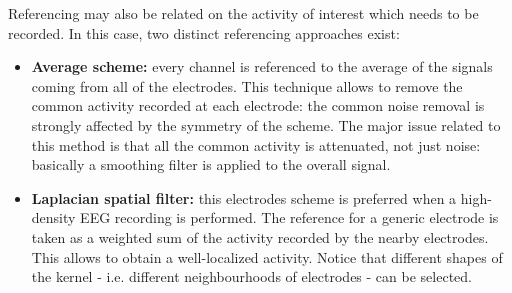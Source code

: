 Referencing may also be related on the activity of interest which needs to be
recorded. In this case, two distinct referencing approaches exist:
\begin{itemize}
    \item \textbf{Average scheme:} every channel is referenced to the average of the signals coming from
          all of the electrodes. This technique allows to remove the common activity recorded at
          each electrode: the common noise removal is strongly affected by the symmetry of the scheme.
          The major issue related to this method is that all the common activity is attenuated, not
          just noise: basically a smoothing filter is applied to the overall signal.
    \item \textbf{Laplacian spatial filter:} this electrodes scheme is preferred when a high-density
          EEG recording is performed. The reference for a generic electrode is taken as a weighted
          sum of the activity recorded by the nearby electrodes. This allows to obtain a
          well-localized activity. Notice that different shapes of the kernel - i.e. different
          neighbourhoods of electrodes - can be selected.
\end{itemize}

